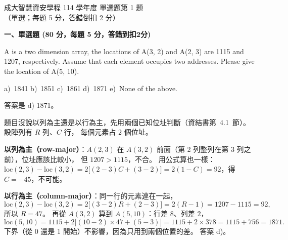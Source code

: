 \begin{pastexam}[label={px:ncku-114-isec-ds-01}]{成大智慧資安學程 114 學年度 單選題第 1 題}
（單選；每題 5 分，答錯倒扣 2 分）

\textbf{一、單選題 (80 分，每題 5 分，答錯到扣2分)}

A is a two dimension array, the locations of A(3, 2) and A(2, 3) are 1115 and 1207, respectively.
Assume that each element occupies two addresses. Please give the location of A(5, 10).

a)~1841 \qquad b)~1851 \qquad c)~1861 \qquad d)~1871 \qquad e)~None of the above.
\end{pastexam}

\begin{pastsoln}
答案是 d) 1871。

題目沒說以列為主還是以行為主，先用兩個已知位址判斷（資結書第~4.1~節）。 設陣列有 $R$ 列、$C$ 行，
每個元素占 $2$ 個位址。

\textbf{以列為主（row-major）}：$A(2, 3)$ 在 $A(3, 2)$ 前面（第 2 列整列在第 3 列之前），位址應該比較小，
但 $1207 > 1115$，不合。 用公式算也一樣：
$\mathrm{loc}(2, 3) - \mathrm{loc}(3, 2) = 2\bigl[(2 - 3)C + (3 - 2)\bigr] = 2(1 - C) = 92$，得 $C = -45$，不可能。

\textbf{以行為主（column-major）}：同一行的元素連在一起，
\[
\mathrm{loc}(2, 3) - \mathrm{loc}(3, 2) = 2\bigl[(3 - 2)R + (2 - 3)\bigr] = 2(R - 1) = 1207 - 1115 = 92,
\]
所以 $R = 47$。 再從 $A(3, 2)$ 算到 $A(5, 10)$：行差 $8$、列差 $2$，
\[
\mathrm{loc}(5, 10) = 1115 + 2\bigl[(10 - 2) \times 47 + (5 - 3)\bigr] = 1115 + 2 \times 378 = 1115 + 756 = 1871 .
\]
下界（從 $0$ 還是 $1$ 開始）不影響，因為只用到兩個位置的差。 答案 d)。
\end{pastsoln}
